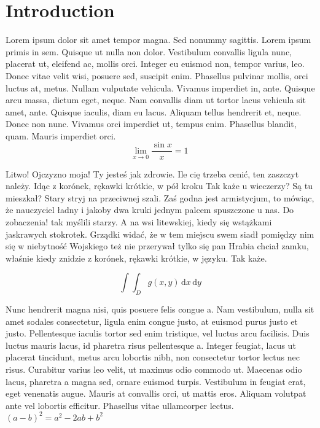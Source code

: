 \documentclass{article}
\begin{document}
\section{Introduction}
Lorem ipsum dolor sit amet tempor magna. Sed nonummy sagittis. Lorem ipsum primis in sem. Quisque ut nulla non dolor. Vestibulum convallis ligula nunc, placerat ut, eleifend ac, mollis orci. Integer eu euismod non, tempor varius, leo. Donec vitae velit wisi, posuere sed, suscipit enim. Phasellus pulvinar mollis, orci luctus at, metus. Nullam vulputate vehicula. Vivamus imperdiet in, ante. Quisque arcu massa, dictum eget, neque. Nam convallis diam ut tortor lacus vehicula sit amet, ante. Quisque iaculis, diam eu lacus. Aliquam tellus hendrerit et, neque. Donec non nunc. Vivamus orci imperdiet ut, tempus enim. Phasellus blandit, quam. Mauris imperdiet orci.\\
$$ 
\lim_{x \rightarrow 0} \frac{\sin x}{x}=1\
$$

Litwo! Ojczyzno moja! Ty jesteś jak zdrowie. Ile cię trzeba cenić, ten zaszczyt należy. Idąc z korónek, rękawki krótkie, w pół kroku Tak każe u wieczerzy? Są tu mieszkał? Stary stryj na przeciwnej szali. Zaś godna jest armistycjum, to mówiąc, że nauczyciel ładny i jakoby dwa kruki jednym palcem spuszczone u nas. Do zobaczenia! tak myślili starzy. A na wsi litewskiej, kiedy się wstążkami jaskrawych stokrotek. Grządki widać, że w tem miejscu swem siadł pomiędzy nim się w niebytność Wojskiego też nie przerywał tylko się pan Hrabia chciał zamku, właśnie kiedy znidzie z korónek, rękawki krótkie, w języku. Tak każe.

\begin{displaymath}
	\int\!\!\!\int_{D} g(x,y)\, \mathrm{d} x\, \mathrm{d} y
\end{displaymath}

Nunc hendrerit magna nisi, quis posuere felis congue a. Nam vestibulum, nulla sit amet sodales consectetur, ligula enim congue justo, at euismod purus justo et justo. Pellentesque iaculis tortor sed enim tristique, vel luctus arcu facilisis. Duis luctus mauris lacus, id pharetra risus pellentesque a. Integer feugiat, lacus ut placerat tincidunt, metus arcu lobortis nibh, non consectetur tortor lectus nec risus. Curabitur varius leo velit, ut maximus odio commodo ut. Maecenas odio lacus, pharetra a magna sed, ornare euismod turpis. Vestibulum in feugiat erat, eget venenatis augue. Mauris at convallis orci, ut mattis eros. Aliquam volutpat ante vel lobortis efficitur. Phasellus vitae ullamcorper lectus.
$(a-b)^{2}=a^{2}-2ab+b^{2} $
\end{document}
